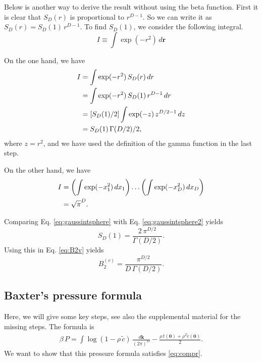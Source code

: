 \documentclass[preprint]{revtex4-1}
\numberwithin{equation}{subsection}
\numberwithin{table}{section}
\newcommand{\vct}[1]{\mathbf{#1}}
\providecommand{\vr}{} %
\renewcommand{\vr}{\vct{r}}
\newcommand{\vk}{\vct{k}}
\newcommand{\dvk}{\frac{d\vk}{(2\pi)^D}}
\begin{document}
Below is another way to derive the result without using the beta function.
%
First it is clear that $S_D(r)$ is proportional to $r^{D-1}$.
So we can write it as $S_D(r) = S_D(1) \, r^{D-1}$.
To find $S_D(1)$, we consider the following integral.
\[
I
\equiv
\int \exp(-r^2) \, d\vr
\]

On the one hand, we have
\begin{align}
  I
&=
  \int \exp(-r^2) \, S_D(r) \, d r
  \notag \\
&=
  \int \exp(-r^2) \, S_D(1) \, r^{D-1} \, dr
  \notag \\
&=
  [S_D(1)/2]
  \int \exp(-z) \, z^{D/2 - 1} \, dz
  \notag \\
&=
  S_D(1) \, \Gamma(D/2)/2,
\label{eq:gaussintsphere}
\end{align}
%
where $z = r^2$,
and we have used the definition of the gamma function in the last step.

On the other hand, we have
\begin{align}
  I
&=
  \left( \int \exp(-x_1^2) \, d x_1 \right)
  \dots
  \left( \int \exp(-x_D^2) \, d x_D \right) \notag \\
&=
  \sqrt\pi^D.
\label{eq:gaussintsphere2}
\end{align}

Comparing Eq. \eqref{eq:gaussintsphere} with Eq. \eqref{eq:gaussintsphere2}
yields
\begin{equation}
  S_D(1) = \frac{ 2 \, \pi^{D/2} } { \Gamma(D/2) }.
  \label{eq:surfareaD}
\end{equation}
Using this in Eq. \eqref{eq:B2v} yields
\[
  B_2^{(v)}
=
  \frac{ \pi^{D/2} } { D \, \Gamma(D/2) }.
\]



\subsection{Baxter's pressure formula}

Here, we will give some key steps, see also the supplemental material
for the missing steps.
%
The formula is
\begin{align}
\beta \, P
=
\int
    \log(1 - \rho \, \tilde c)
   \, \dvk
  -
    \frac{\rho \, t(\vct{0}) + \rho^2 \tilde{c}(\vct{0}) } {2}.
  \label{eq:Pbaxter}
\end{align}
We want to show that this pressure formula satisfies \eqref{eq:compr}.
\end{document}
